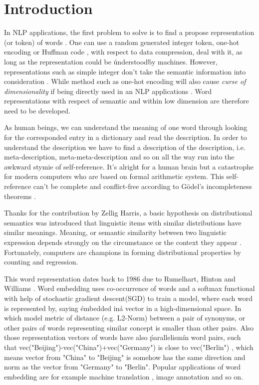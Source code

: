 \section{Introduction}
In NLP applications, the first problem to solve is to find a propose representation (or token) of words \cite{schutze2008introduction}. One can use a random generated integer token, one-hot encoding \cite{turian2010word} or Huffman code \cite{el2006compression}, with respect to data compression, deal with it, as long as the representation could be \'understood\' by machines. However, representations such as simple integer don't take the semantic information into consideration \cite{le2014distributed}. While method such as one-hot encoding will also cause \textit{curse of dimensionality} if being directly used in an NLP applications \cite{bengio2003neural}. Word representations with respect of semantic and within low dimension are therefore need to be developed. 

As human beings, we can understand the meaning of one word through looking for the corresponded entry in a dictionary and read the description. In order to understand the description we have to find a description of the description, i.e. meta-description, meta-meta-description and so on all the way run into the awkward stymie of self-reference. It's alright for a human brain but a catastrophe for modern computers who are based on formal arithmetic system. This self-reference can't be complete and conflict-free according to G{\"o}del's incompleteness theorems \cite{godel1931formal}.

Thanks for the contribution by Zellig Harris, a basic hypothesis on distributional semantics was introduced that linguistic items with similar distributions have similar meanings. Meaning, or semantic similarity between two linguistic expression depends strongly on the circumstance or the context they appear \cite{harris1954distributional}. Fortunately, computers are champions in forming distributional properties by counting and regression.

This word representation dates back to 1986 due to Rumelhart, Hinton and Williams \cite{williams1986learning}. Word embedding uses co-occurrence of words and a softmax functional with help of stochastic gradient descent(SGD) to train a model, where each word is represented by, saying \'embedded in\' a vector in a high-dimensional space. In which model metric of distance (e.g. L2-Norm) between a pair of synonyms, or other pairs of words representing similar concept is smaller than other pairs. Also those representation vectors of words have also \'parallelism\' in word pairs, such that vec("Beijing")-vec("China")+vec("Germany") is close to vec("Berlin") \cite{le2014distributed}, which means vector from "China" to "Beijing" is somehow has the same direction and norm as the vector from "Germany" to "Berlin". Popular applications of word embedding are for example machine translation \cite{cho2014learning}, image annotation \cite{weston2011wsabie} and so on. 

